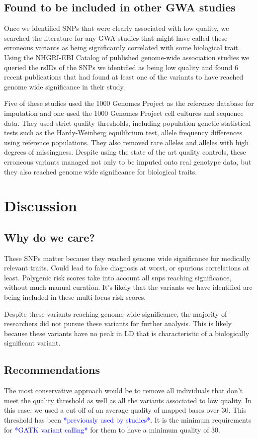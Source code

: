 \documentclass[9pt,lineno]{elife}
\newcommand{\todo}[1]{\textcolor{blue}{*#1*}}
\begin{document}
	\subsection{Found to be included in other GWA studies}
Once we identified SNPs that were clearly associated with low quality, we searched the literature for any GWA studies that might have called these erroneous variants as being significantly correlated with some biological trait. 
Using the NHGRI-EBI Catalog of published genome-wide association studies we queried the rsIDs of the SNPs we identified as being low quality and found 6 recent publications that had found at least one of the variants to have reached genome wide significance in their study. 

Five of these studies used the 1000 Genomes Project as the reference database for imputation and one used the 1000 Genomes Project cell cultures and sequence data. 
They used strict quality thresholds, including population genetic statistical tests such as the Hardy-Weinberg equilibrium test, allele frequency differences using reference populations. 
They also removed rare alleles and alleles with high degrees of missingness. 
Despite using the state of the art quality controls, these erroneous variants managed not only to be imputed onto real genotype data, but they also reached genome wide significance for biological traits. 

			\section{Discussion}
\subsection{Why do we care?}
These SNPs matter because they reached genome wide significance for medically relevant traits. 
Could lead to false diagnosis at worst, or spurious correlations at least. 
Polygenic risk scores take into account all snps reaching significance, without much manual curation. 
It's likely that the variants we have identified are being included in these multi-locus risk scores.


Despite these variants reaching genome wide significance, the majority of researchers did not pursue these variants for further analysis.
This is likely because these variants have no peak in LD that is characteristic of a biologically significant variant.

\subsection{Recommendations}
The most conservative approach would be to remove all individuals that don't meet the quality threshold as well as all the variants associated to low quality.
In this case, we used a cut off of an average quality of mapped bases over 30. This threshold has been \todo{previously used by studies}. It is the minimum requirements for \todo{GATK variant calling} for them to have a minimum quality of 30.
\end{document}
